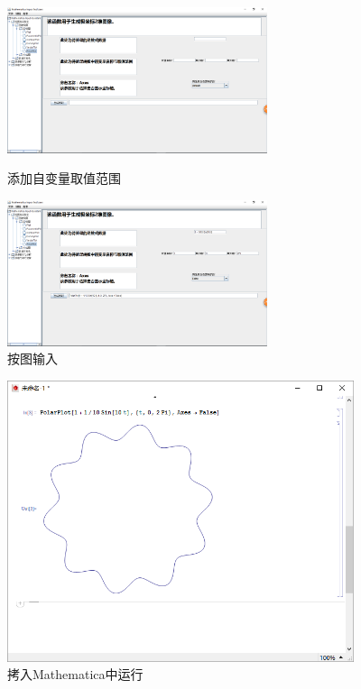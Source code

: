 \documentclass[hyperref, UTF8
,bookmarksnumbered=true, oneside]{ctexbook}
\begin{document}
            	\begin{figure}[!h]
	                \begin{minipage}[b]{0.45\textwidth}
	                \centering
	                \includegraphics[width=3in]{14.png}
	                \caption{添加自变量取值范围}
	                \label{pic:MathPack}
	                \end{minipage}%
	                \hspace{0.1\textwidth}%
	                \begin{minipage}[b]{0.45\textwidth}
	                \centering
	                \includegraphics[width=3in]{15.png}
	                \caption{按图输入}
	                \label{pic:GUIPack}
	                \end{minipage}
            	\end{figure}

            	\begin{figure}[!h]
                	\centering
                	\includegraphics[width=4in]{16.png}
                	\caption{拷入Mathematica中运行}    
                	\label{pic:MathObject}
            	\end{figure}
            	\bigskip
           \bigskip
\end{document}
